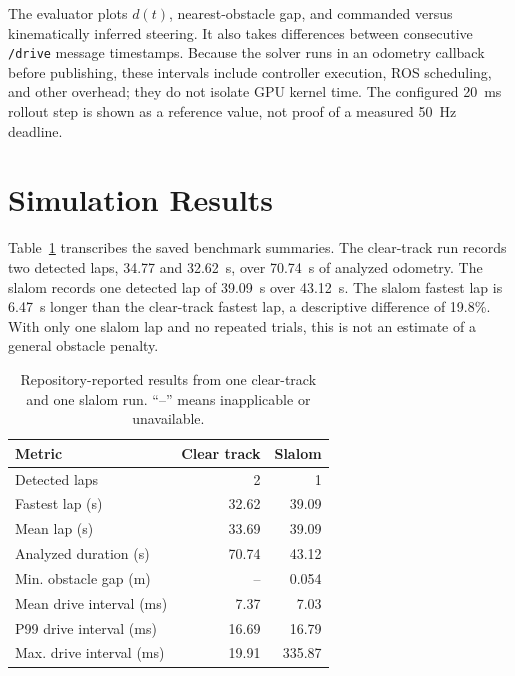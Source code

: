 \documentclass{jamris}
\begin{document}
The evaluator plots $d(t)$, nearest-obstacle gap, and commanded versus kinematically inferred steering. It also takes differences between consecutive \texttt{/drive} message timestamps. Because the solver runs in an odometry callback before publishing, these intervals include controller execution, ROS scheduling, and other overhead; they do not isolate GPU kernel time. The configured 20~ms rollout step is shown as a reference value, not proof of a measured 50~Hz deadline.

\section{Simulation Results}
Table~\ref{tab:results} transcribes the saved benchmark summaries. The clear-track run records two detected laps, 34.77 and 32.62~s, over 70.74~s of analyzed odometry. The slalom records one detected lap of 39.09~s over 43.12~s. The slalom fastest lap is 6.47~s longer than the clear-track fastest lap, a descriptive difference of 19.8\%. With only one slalom lap and no repeated trials, this is not an estimate of a general obstacle penalty.

\begin{table}[htb]
\centering
\caption{Repository-reported results from one clear-track and one slalom run. ``--'' means inapplicable or unavailable.}
\label{tab:results}
\small
\begin{tabular}{lrr}
\toprule
Metric & Clear track & Slalom\\
\midrule
Detected laps & 2 & 1\\
Fastest lap (s) & 32.62 & 39.09\\
Mean lap (s) & 33.69 & 39.09\\
Analyzed duration (s) & 70.74 & 43.12\\
Min. obstacle gap (m) & -- & 0.054\\
Mean drive interval (ms) & 7.37 & 7.03\\
P99 drive interval (ms) & 16.69 & 16.79\\
Max. drive interval (ms) & 19.91 & 335.87\\
\bottomrule
\end{tabular}
\end{table}
\end{document}
